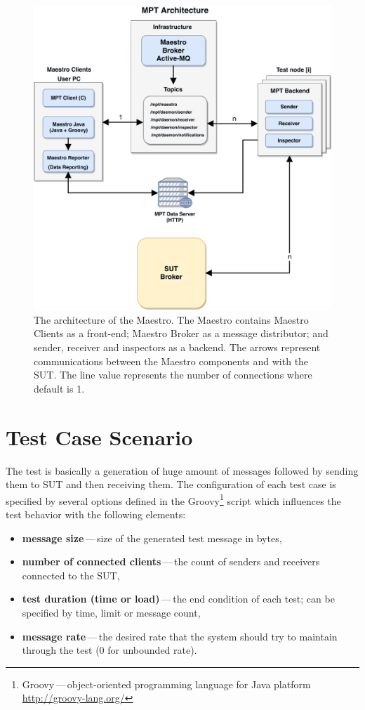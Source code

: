 \begin{figure}[H]
  \centering
  \includegraphics[width=15cm]{obrazky-figures/msg_perf_tool.pdf}
  \caption{The architecture of the Maestro. The Maestro contains Maestro Clients as a front-end; Maestro Broker as a message distributor; and sender, receiver and inspectors as a backend. The arrows represent communications between the Maestro components and with the SUT. The line value represents the number of connections where default is 1.}
  \label{fig:msg_perf_tool}
\end{figure}

\newpage

\section{Test Case Scenario}
The test is basically a generation of huge amount of messages followed by sending them to SUT and then receiving them. The configuration of each test case is specified by several options defined in the Groovy\footnote{Groovy\,---\,object-oriented programming language for Java platform \url{http://groovy-lang.org/}} script which influences the test behavior with the following elements:

\begin{itemize}
	\setlength\itemsep{0em}
	\item \textbf{message size}\,---\,size of the generated test message in bytes,
	\item \textbf{number of connected clients}\,---\,the count of senders and receivers connected to the SUT,
	\item \textbf{test duration (time or load)}\,---\,the end condition of each test; can be specified by time, limit or message count,
	\item \textbf{message rate}\,---\,the desired rate that the system should try to maintain through the test (0 for unbounded rate).
\end{itemize}

